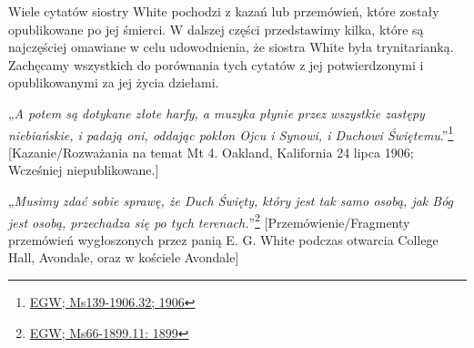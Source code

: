 Wiele cytatów siostry White pochodzi z kazań lub przemówień, które zostały opublikowane po jej śmierci. W dalszej części przedstawimy kilka, które są najczęściej omawiane w celu udowodnienia, że siostra White była trynitarianką. Zachęcamy wszystkich do porównania tych cytatów z jej potwierdzonymi i opublikowanymi za jej życia dziełami.

„\textit{A potem są dotykane złote harfy, a muzyka płynie przez wszystkie zastępy niebiańskie, i padają oni, oddając pokłon Ojcu i Synowi, i Duchowi Świętemu}.”\footnote{\href{https://egwwritings.org/?ref=en_Ms139-1906.32&para=9579.38}{EGW; Ms139-1906.32; 1906}} [Kazanie/Rozważania na temat Mt 4. Oakland, Kalifornia 24 lipca 1906; Wcześniej niepublikowane.]

„\textit{Musimy zdać sobie sprawę, że Duch Święty, który jest tak samo osobą, jak Bóg jest osobą, przechadza się po tych terenach.}”\footnote{\href{https://egwwritings.org/?ref=en_Ms66-1899.11&para=6622.19}{EGW; Ms66-1899.11: 1899}} [Przemówienie/Fragmenty przemówień wygłoszonych przez panią E. G. White podczas otwarcia College Hall, Avondale, oraz w kościele Avondale]
